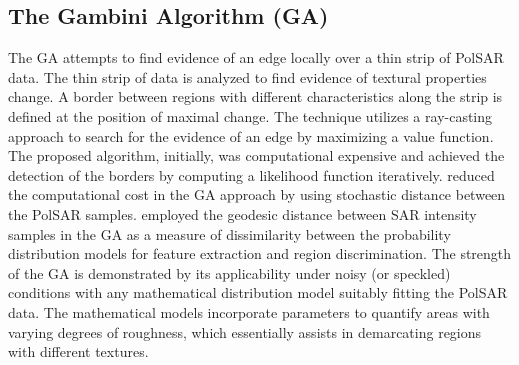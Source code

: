 \documentclass[remotesensing,article,submit,pdftex,moreauthors]{Definitions/mdpi}
\begin{document}
\subsection{The Gambini Algorithm (GA)}
The GA attempts to find evidence of an edge locally over a thin strip of PolSAR data. The thin strip of data is analyzed to find evidence of textural properties change. A border between regions with different characteristics along the strip is defined at the position of maximal change. The technique utilizes a ray-casting approach to search for the evidence of an edge by maximizing a value function. The proposed algorithm, initially, was computational expensive and achieved the detection of the borders by computing a likelihood function iteratively. \citet{EdgeDetectionDistancesEntropiesJSTARS} reduced the computational cost in the GA approach by using stochastic distance between the PolSAR samples. \citet{GeodesicDistanceGI0JSTARS} employed the geodesic distance between SAR  intensity samples in the GA as a measure of dissimilarity between the probability distribution models for feature extraction and region discrimination.  
The strength of the GA is demonstrated by its applicability under noisy (or speckled) conditions with any mathematical distribution model suitably fitting the PolSAR data. 
The mathematical models incorporate parameters to quantify areas with varying degrees of roughness, which essentially assists in demarcating regions with different textures.
\end{document}
